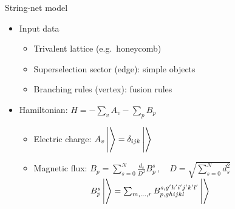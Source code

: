 \documentclass{fdubeamer}
\newcommand{\tikzinput}[1]{}
\newcommand{\1}{\mathbb{1}}
\begin{document}
\begin{frame}{String-net model}

\begin{itemize}
  \item Input data

    \begin{itemize}
      \item Trivalent lattice (e.g.\ honeycomb)
      \item Superselection sector (edge): simple objects
      \item Branching rules (vertex): fusion rules
    \end{itemize}

  \item Hamiltonian: $H = -\sum_v A_v - \sum_p B_p$

    \begin{itemize}
      \item Electric charge:
        $A_v \, \ket[\Bigg]{\tikzinput{string-net/fusion-2}} = \delta_{ijk} \, \ket[\Bigg]{\tikzinput{string-net/fusion-2}}$
      \item Magnetic flux:
        $B_p = \sum_{s=0}^N \frac{d_s}{D^2} B_p^s \, , \quad D = \sqrt{\sum_{s=0}^N d_s^2}$ \\
        $
            \phantom{\text{Magnetic flux:~}}
            B_p^s \, \ket[\Bigg]{\def\Prime{}\tikzinput{string-net/hexagon}}
          = \sum_{m,\dots,r} B_{p,ghijkl}^{s,g'h'i'j'k'l'} \,
            \ket[\Bigg]{\def\Prime{'}\tikzinput{string-net/hexagon}}
        $
    \end{itemize}
\end{itemize}

\end{frame}
\end{document}
